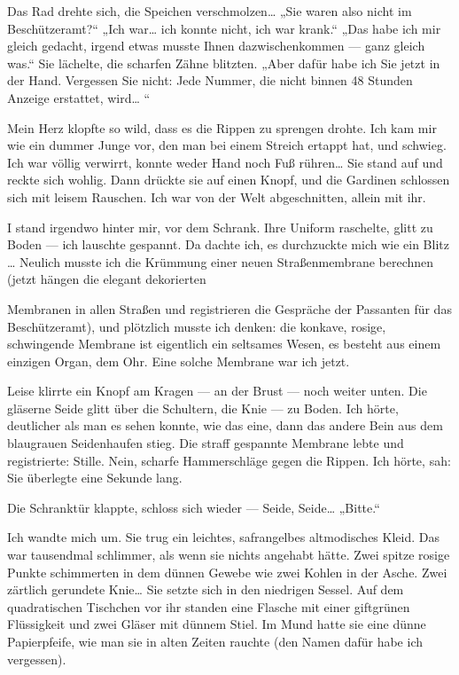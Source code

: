 Das Rad drehte sich, die Speichen verschmolzen\ldots{} „Sie waren also
nicht im Beschützeramt?“ „Ich war\ldots{} ich konnte nicht, ich war
krank.“ „Das habe ich mir gleich gedacht, irgend etwas musste Ihnen
dazwischenkommen — ganz gleich was.“ Sie lächelte, die scharfen
Zähne blitzten. „Aber dafür habe ich Sie jetzt in der Hand.
Vergessen Sie nicht: Jede Nummer, die nicht binnen 48 Stunden
Anzeige erstattet, wird\ldots{} “

Mein Herz klopfte so wild, dass es die Rippen zu sprengen drohte.
Ich kam mir wie ein dummer Junge vor, den man bei einem Streich
ertappt hat, und schwieg. Ich war völlig verwirrt, konnte weder
Hand noch Fuß rühren\ldots{} Sie stand auf und reckte sich wohlig. Dann
drückte sie auf einen Knopf, und die Gardinen schlossen sich mit
leisem Rauschen. Ich war von der Welt abgeschnitten, allein mit
ihr.

I stand irgendwo hinter mir, vor dem Schrank. Ihre Uniform
raschelte, glitt zu Boden — ich lauschte gespannt. Da dachte ich,
es durchzuckte mich wie ein Blitz \ldots{} Neulich musste ich die
Krümmung einer neuen Straßenmembrane berechnen (jetzt hängen die
elegant dekorierten

Membranen in allen Straßen und registrieren die Gespräche der
Passanten für das Beschützeramt), und plötzlich musste ich denken:
die konkave, rosige, schwingende Membrane ist eigentlich ein
seltsames Wesen, es besteht aus einem einzigen Organ, dem Ohr. Eine
solche Membrane war ich jetzt.

Leise klirrte ein Knopf am Kragen — an der Brust — noch weiter
unten. Die gläserne Seide glitt über die Schultern, die Knie — zu
Boden. Ich hörte, deutlicher als man es sehen konnte, wie das eine,
dann das andere Bein aus dem blaugrauen Seidenhaufen stieg. Die
straff gespannte Membrane lebte und registrierte: Stille. Nein,
scharfe Hammerschläge gegen die Rippen. Ich hörte, sah: Sie
überlegte eine Sekunde lang.

Die Schranktür klappte, schloss sich wieder — Seide, Seide\ldots{}
„Bitte.“

Ich wandte mich um. Sie trug ein leichtes, safrangelbes
altmodisches Kleid. Das war tausendmal schlimmer, als wenn sie
nichts angehabt hätte. Zwei spitze rosige Punkte schimmerten in dem
dünnen Gewebe wie zwei Kohlen in der Asche. Zwei zärtlich gerundete
Knie\ldots{} Sie setzte sich in den niedrigen Sessel. Auf dem
quadratischen Tischchen vor ihr standen eine Flasche mit einer
giftgrünen Flüssigkeit und zwei Gläser mit dünnem Stiel. Im Mund
hatte sie eine dünne Papierpfeife, wie man sie in alten Zeiten
rauchte (den Namen dafür habe ich vergessen).

